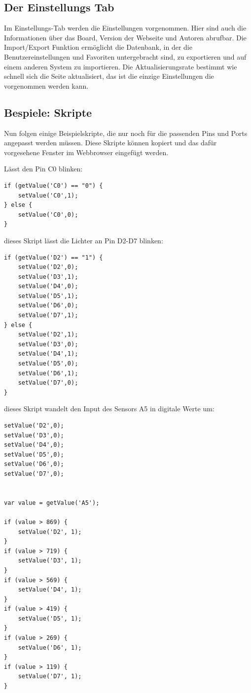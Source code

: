 \subsection{Der Einstellungs Tab}
Im Einstellungs-Tab werden die Einstellungen vorgenommen. Hier sind auch die
Informationen über das Board, Version der Webseite und Autoren abrufbar. Die
Import/Export Funktion ermöglicht die Datenbank, in der die Benutzereinstellungen
und Favoriten untergebracht sind, zu exportieren und auf einem anderen System zu
importieren. Die Aktualisierungsrate bestimmt wie schnell sich die Seite
aktualisiert, das ist die einzige Einstellungen die vorgenommen werden kann.

\subsection{Bespiele: Skripte}
Nun folgen einige Beispielskripte, die nur noch für die passenden Pins und Ports angepasst
werden müssen. Diese Skripte können kopiert und das dafür vorgesehene Fenster
im Webbrowser eingefügt werden.

Lässt den Pin C0 blinken:\newline
\begin{lstlisting}
if (getValue('C0') == "0") {
	setValue('C0',1);
} else {
	setValue('C0',0);
}
\end{lstlisting}

dieses Skript lässt die Lichter an Pin D2-D7 blinken:\newline
\begin{lstlisting}
if (getValue('D2') == "1") {
	setValue('D2',0);
	setValue('D3',1);
	setValue('D4',0);
	setValue('D5',1);
	setValue('D6',0);
	setValue('D7',1);
} else {
	setValue('D2',1);
	setValue('D3',0);
	setValue('D4',1);
	setValue('D5',0);
	setValue('D6',1);
	setValue('D7',0);
}
\end{lstlisting}

dieses Skript wandelt den Input des Sensors A5 in digitale Werte um:\newline
\begin{lstlisting}
setValue('D2',0);
setValue('D3',0);
setValue('D4',0);
setValue('D5',0);
setValue('D6',0);
setValue('D7',0);


var value = getValue('A5');

if (value > 869) {
	setValue('D2', 1);
}
if (value > 719) {
	setValue('D3', 1);
}
if (value > 569) {
	setValue('D4', 1);
}
if (value > 419) {
	setValue('D5', 1);
}
if (value > 269) {
	setValue('D6', 1);
}
if (value > 119) {
	setValue('D7', 1);
}
\end{lstlisting}

